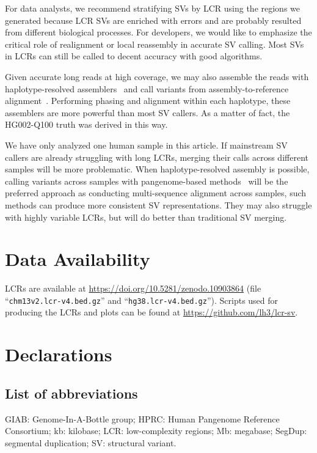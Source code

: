 \documentclass[a4paper,num-refs]{oup-contemporary}
\begin{document}
For data analysts, we recommend stratifying SVs by LCR using the regions we generated
because LCR SVs are enriched with errors and are probably resulted from different biological processes.
For developers, we would like to emphasize the critical role of realignment or local reassembly in accurate SV calling.
Most SVs in LCRs can still be called to decent accuracy with good algorithms.

Given accurate long reads at high coverage, we may also assemble
the reads with haplotype-resolved assemblers~\cite{Cheng:2021aa,Rautiainen:2023ab}
and call variants from assembly-to-reference alignment~\cite{Li:2018aa}.
Performing phasing and alignment within each haplotype,
these assemblers are more powerful than most SV callers.
As a matter of fact, the HG002-Q100 truth was derived in this way.

We have only analyzed one human sample in this article.
If mainstream SV callers are already struggling with long LCRs,
merging their calls across different samples will be more problematic.
When haplotype-resolved assembly is possible,
calling variants across samples with pangenome-based methods~\cite{Li:2020aa,Hickey:2024aa,Garrison:2024ab}
will be the preferred approach as conducting multi-sequence alignment across samples,
such methods can produce more consistent SV representations.
They may also struggle with highly variable LCRs,
but will do better than traditional SV merging.

\section{Data Availability}

LCRs are available at \url{https://doi.org/10.5281/zenodo.10903864}
(file ``{\tt chm13v2.lcr-v4.bed.gz}'' and ``{\tt hg38.lcr-v4.bed.gz}'').
Scripts used for producing the LCRs and plots
can be found at \url{https://github.com/lh3/lcr-sv}.

\section{Declarations}

\subsection{List of abbreviations}

GIAB: Genome-In-A-Bottle group;
HPRC: Human Pangenome Reference Consortium;
kb: kilobase;
LCR: low-complexity regions;
Mb: megabase;
SegDup: segmental duplication;
SV: structural variant.
\end{document}
